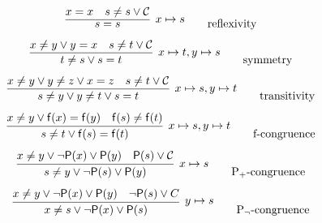 \begin{gather*}
	\infer[x\mapsto s]
	{{ s=s} 
		}
	{x = x & s\neq s \lor \mcC } 
	\tag*{reflexivity}
	\\[0.4em]
	\infer[x\mapsto t, y\mapsto s]
	{t\neq s \lor s=t}
	{x\neq y\lor y=x & s\neq t \lor \mcC}
	\tag*{symmetry}
	\\[0.4em]
	\infer[x\mapsto s, y\mapsto t]
	{s\neq y \lor y \neq t \lor s = t}
	{x\neq y \lor y\neq z \lor x = z & s \neq t \lor \mcC}
	\tag*{transitivity}
	\\[0.4em]
	\infer[x\mapsto s,y\mapsto t]
	{s \neq t \lor \mf(s) = \mf(t)}
	{x\neq y \lor \mf(x) = \mf(y) & \mf(s)\neq \mf(t)}
	\tag*{f-congruence}
	\\[0.4em]
	\infer[x \mapsto s]
	{s \neq y \lor \lnot\mP(s) \lor \mP(y)}
	{x \neq y \lor \lnot \mP(x) \lor \mP(y) & {\mP(s)} \lor \mcC}
	\tag*{P$_+$-congruence}
	\\[0.4em]
	\infer[y\mapsto s]
	{x\neq s \lor \lnot \mP(x) \lor \mP(s)}
	{x \neq y \lor \lnot \mP(x) \lor \mP(y) & {\lnot\mP(s)} \lor C}
	\tag*{P$_\lnot$-congruence}
\end{gather*}
